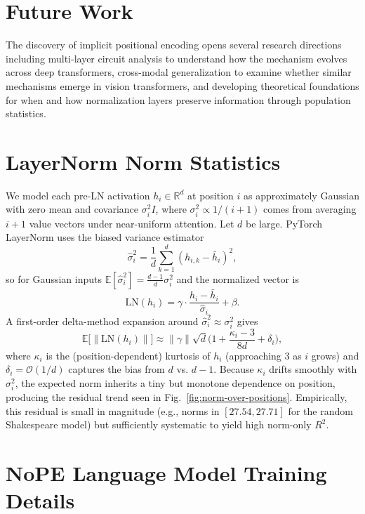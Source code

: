 \documentclass[11pt]{article}
\begin{document}
\section*{Future Work}

The discovery of implicit positional encoding opens several research directions including multi-layer circuit analysis to understand how the mechanism evolves across deep transformers, cross-modal generalization to examine whether similar mechanisms emerge in vision transformers, and developing theoretical foundations for when and how normalization layers preserve information through population statistics.




\appendix

\section{LayerNorm Norm Statistics}\label{sec:ln-norm-derivation}

We model each pre-LN activation $h_i \in \mathbb{R}^d$ at position $i$ as approximately Gaussian with zero mean and covariance $\sigma_i^2 I$, where $\sigma_i^2 \propto 1/(i{+}1)$ comes from averaging $i{+}1$ value vectors under near-uniform attention. Let $d$ be large. PyTorch LayerNorm uses the biased variance estimator
\[
\hat\sigma_i^2 = \frac{1}{d} \sum_{k=1}^d (h_{i,k} - \bar{h}_i)^2,
\]
so for Gaussian inputs $\mathbb{E}[\hat\sigma_i^2] = \tfrac{d-1}{d} \sigma_i^2$ and the normalized vector is
\[
\text{LN}(h_i) = \gamma \cdot \frac{h_i - \bar{h}_i}{\hat\sigma_i} + \beta.
\]
A first-order delta-method expansion around $\hat\sigma_i^2 \approx \sigma_i^2$ gives
\[
\mathbb{E}\big[\|\text{LN}(h_i)\|\big] \approx \|\gamma\| \sqrt{d} \Big(1 + \frac{\kappa_i - 3}{8d} + \delta_i\Big),
\]
where $\kappa_i$ is the (position-dependent) kurtosis of $h_i$ (approaching 3 as $i$ grows) and $\delta_i = \mathcal{O}(1/d)$ captures the bias from $d$ vs. $d{-}1$. Because $\kappa_i$ drifts smoothly with $\sigma_i^2$, the expected norm inherits a tiny but monotone dependence on position, producing the residual trend seen in Fig.~\ref{fig:norm-over-positions}. Empirically, this residual is small in magnitude (e.g., norms in $[27.54, 27.71]$ for the random Shakespeare model) but sufficiently systematic to yield high norm-only $R^2$.

\section{NoPE Language Model Training Details}\label{app:nope-training}
\end{document}
